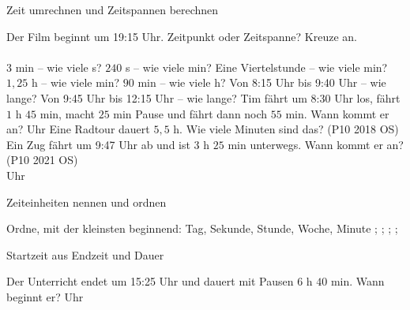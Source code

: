 \setcounter{aufgabe}{22}

\begin{aufgabe}{Zeit umrechnen und Zeitspannen berechnen}
\begin{teile}
\teil Der Film beginnt um 19:15 Uhr. Zeitpunkt oder Zeitspanne? Kreuze an.\\ \\ 
\teil $3$ min – wie viele s? \leerfeld[s]
\teil $240$ s – wie viele min? \leerfeld[min]
\teil Eine Viertelstunde – wie viele min? \leerfeld[min]
\teil $1{,}25$ h – wie viele min? \leerfeld[min]
\teil $90$ min – wie viele h? \leerfeld[h]
\teil Von 8:15 Uhr bis 9:40 Uhr – wie lange? \leerfeld[h] \leerfeld[min]
\teil Von 9:45 Uhr bis 12:15 Uhr – wie lange? \leerfeld[h] \leerfeld[min]
\teil Tim fährt um 8:30 Uhr los, fährt $1$ h $45$ min, macht $25$ min Pause und fährt dann noch $55$ min. Wann kommt er an? \leerfeld Uhr
\teil Eine Radtour dauert $5{,}5$ h. Wie viele Minuten sind das? \hfill (P10 2018 OS) \\ \leerfeld[min]
\teil Ein Zug fährt um 9:47 Uhr ab und ist $3$ h $25$ min unterwegs. Wann kommt er an? \hfill (P10 2021 OS) \\ \leerfeld Uhr
\end{teile}
\end{aufgabe}

\begin{aufgabe}{Zeiteinheiten nennen und ordnen}
\begin{teile}
\teil Ordne, mit der kleinsten beginnend: Tag, Sekunde, Stunde, Woche, Minute \leerfeld ; \leerfeld ; \leerfeld ; \leerfeld ; \leerfeld
\end{teile}
\end{aufgabe}

\begin{aufgabe}{Startzeit aus Endzeit und Dauer}
\begin{teile}
\teil Der Unterricht endet um 15:25 Uhr und dauert mit Pausen $6$ h $40$ min. Wann beginnt er? \leerfeld Uhr
\end{teile}
\end{aufgabe}

